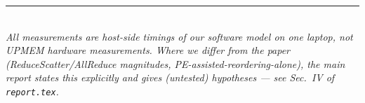 \documentclass[11pt]{article}
\begin{document}
\vspace{0.3cm}
\noindent\rule{\textwidth}{0.4pt}\\[2pt]
{\small\textit{All measurements are host-side timings of our software model on one laptop, not UPMEM hardware measurements. Where we differ from the paper (ReduceScatter/AllReduce magnitudes, PE-assisted-reordering-alone), the main report states this explicitly and gives (untested) hypotheses --- see Sec.~IV of \texttt{report.tex}.}}
\end{document}
